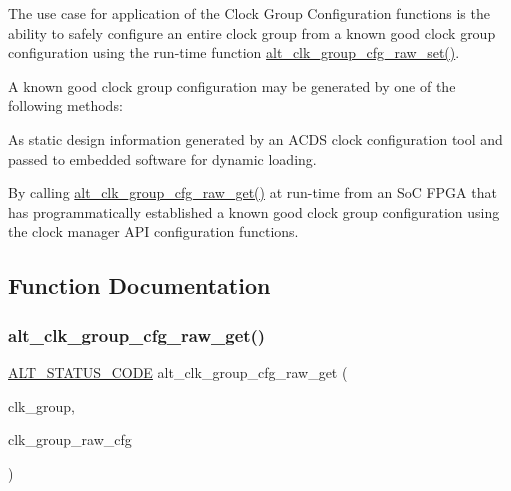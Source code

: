 The use case for application of the Clock Group Configuration functions is the ability to safely configure an entire clock group from a known good clock group configuration using the run-\/time function \mbox{\hyperlink{group__CLK__MGR__GROUP__CFG_ga760bdf4144b1cab6a00c712268c29ef0}{alt\+\_\+clk\+\_\+group\+\_\+cfg\+\_\+raw\+\_\+set()}}.

A known good clock group configuration may be generated by one of the following methods\+:


\begin{DoxyItemize}
\item As static design information generated by an A\+C\+DS clock configuration tool and passed to embedded software for dynamic loading.
\item By calling \mbox{\hyperlink{group__CLK__MGR__GROUP__CFG_ga8bcf8cd04e2eddface10a7a0dd6f7b3d}{alt\+\_\+clk\+\_\+group\+\_\+cfg\+\_\+raw\+\_\+get()}} at run-\/time from an SoC F\+P\+GA that has programmatically established a known good clock group configuration using the clock manager A\+PI configuration functions. 
\end{DoxyItemize}

\subsection{Function Documentation}
\mbox{\label{group__CLK__MGR__GROUP__CFG_ga8bcf8cd04e2eddface10a7a0dd6f7b3d}} 
\subsubsection{\texorpdfstring{alt\_clk\_group\_cfg\_raw\_get()}{alt\_clk\_group\_cfg\_raw\_get()}}
{\footnotesize\ttfamily \mbox{\hyperlink{hwlib_8h_abdb0d369f069723ca55d6c94bcaaaa12}{A\+L\+T\+\_\+\+S\+T\+A\+T\+U\+S\+\_\+\+C\+O\+DE}} alt\+\_\+clk\+\_\+group\+\_\+cfg\+\_\+raw\+\_\+get (\begin{DoxyParamCaption}\item[{\mbox{\hyperlink{alt__clock__group_8h_a077fbf1185c79377d6bdfe47a56713eb}{A\+L\+T\+\_\+\+C\+L\+K\+\_\+\+G\+R\+P\+\_\+t}}}]{clk\+\_\+group,  }\item[{\mbox{\hyperlink{alt__clock__group_8h_aa160da43d5fe69a1f50985e94e199b54}{A\+L\+T\+\_\+\+C\+L\+K\+\_\+\+G\+R\+O\+U\+P\+\_\+\+R\+A\+W\+\_\+\+C\+F\+G\+\_\+t}} $\ast$}]{clk\+\_\+group\+\_\+raw\+\_\+cfg }\end{DoxyParamCaption})}

